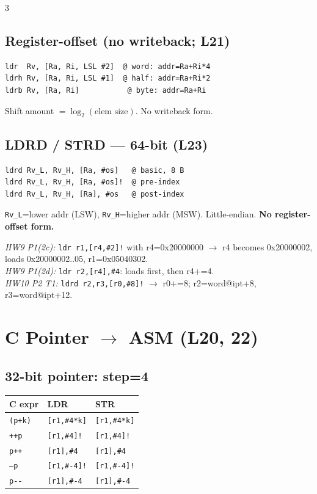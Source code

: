 \documentclass[8pt,landscape]{extarticle}
\newcommand{\asm}[1]{\texttt{\scriptsize #1}}
\newcommand{\cee}[1]{\texttt{\scriptsize #1}}
\begin{document}
\begin{multicols*}{3}
\subsection{Register-offset (no writeback; L21)}
\begin{lstlisting}
ldr  Rv, [Ra, Ri, LSL #2]  @ word: addr=Ra+Ri*4
ldrh Rv, [Ra, Ri, LSL #1]  @ half: addr=Ra+Ri*2
ldrb Rv, [Ra, Ri]           @ byte: addr=Ra+Ri
\end{lstlisting}
Shift amount $=\log_2(\text{elem size})$. No writeback form.

\subsection{LDRD / STRD --- 64-bit (L23)}
\begin{lstlisting}
ldrd Rv_L, Rv_H, [Ra, #os]   @ basic, 8 B
ldrd Rv_L, Rv_H, [Ra, #os]!  @ pre-index
ldrd Rv_L, Rv_H, [Ra], #os   @ post-index
\end{lstlisting}
\texttt{Rv\_L}=lower addr (LSW), \texttt{Rv\_H}=higher addr (MSW). Little-endian. \textbf{No register-offset form.}

\textit{HW9 P1(2c):} \asm{ldr r1,[r4,\#2]!} with r4=0x20000000 $\to$ r4 becomes 0x20000002, loads 0x20000002..05, r1=0x05040302.\\
\textit{HW9 P1(2d):} \asm{ldr r2,[r4],\#4}: loads first, then r4+=4.\\
\textit{HW10 P2 T1:} \asm{ldrd r2,r3,[r0,\#8]!} $\to$ r0+=8; r2=word@ipt+8, r3=word@ipt+12.

\section{C Pointer $\to$ ASM (L20, 22)}

\subsection{32-bit pointer: step=4}
\begin{tabular}{@{}lll@{}}
\toprule
C expr & LDR & STR \\
\midrule
\cee{*(p+k)} & \asm{[r1,\#4*k]}   & \asm{[r1,\#4*k]} \\
\cee{*++p}   & \asm{[r1,\#4]!}    & \asm{[r1,\#4]!}  \\
\cee{*p++}   & \asm{[r1],\#4}     & \asm{[r1],\#4}   \\
\cee{*--p}   & \asm{[r1,\#-4]!}   & \asm{[r1,\#-4]!} \\
\cee{*p-{}-} & \asm{[r1],\#-4}    & \asm{[r1],\#-4}  \\
\bottomrule
\end{tabular}


\end{multicols*}
\end{document}
